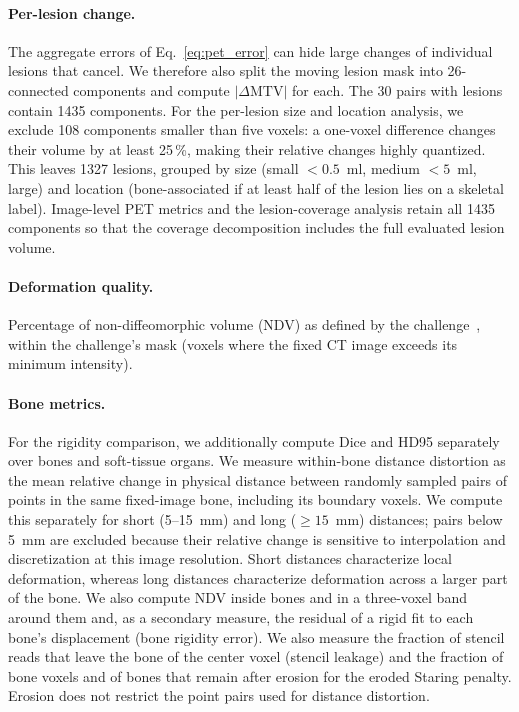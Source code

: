 \paragraph{Per-lesion change.}
The aggregate errors of Eq.~\eqref{eq:pet_error} can hide large changes of individual lesions that cancel.
We therefore also split the moving lesion mask into 26-connected components and compute $|\Delta\mathrm{MTV}|$ for each.
The 30 pairs with lesions contain 1435 components.
For the per-lesion size and location analysis, we exclude 108 components smaller than five voxels: a one-voxel difference changes their volume by at least 25\,\%, making their relative changes highly quantized.
This leaves 1327 lesions, grouped by size (small $<0.5$~ml, medium $<5$~ml, large) and location (bone-associated if at least half of the lesion lies on a skeletal label).
Image-level PET metrics and the lesion-coverage analysis retain all 1435 components so that the coverage decomposition includes the full evaluated lesion volume.

\paragraph{Deformation quality.}
Percentage of non-diffeomorphic volume (NDV) as defined by the challenge~\cite{Liu2024}, within the challenge's mask (voxels where the fixed CT image exceeds its minimum intensity).

\paragraph{Bone metrics.}
For the rigidity comparison, we additionally compute Dice and HD95 separately over bones and soft-tissue organs.
We measure within-bone distance distortion as the mean relative change in physical distance between randomly sampled pairs of points in the same fixed-image bone, including its boundary voxels.
We compute this separately for short (5--15~mm) and long ($\geq15$~mm) distances; pairs below 5~mm are excluded because their relative change is sensitive to interpolation and discretization at this image resolution.
Short distances characterize local deformation, whereas long distances characterize deformation across a larger part of the bone.
We also compute NDV inside bones and in a three-voxel band around them and, as a secondary measure, the residual of a rigid fit to each bone's displacement (bone rigidity error).
We also measure the fraction of stencil reads that leave the bone of the center voxel (stencil leakage) and the fraction of bone voxels and of bones that remain after erosion for the eroded Staring penalty.
Erosion does not restrict the point pairs used for distance distortion.

